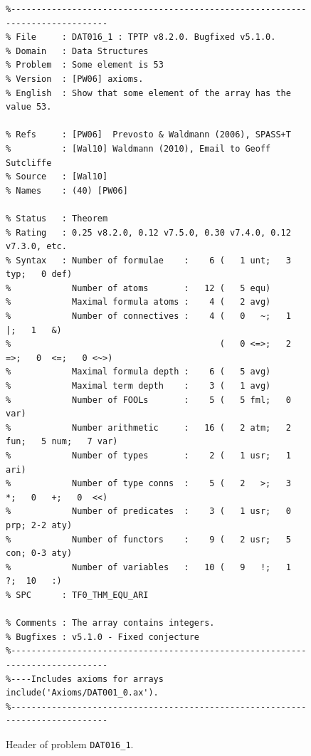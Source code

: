 \documentclass[runningheads]{llncs}
\begin{document}
\begin{figure}[htb]
\centering
{\scriptsize
{\setlength{\baselineskip}{2.5mm}
\begin{verbatim}
%------------------------------------------------------------------------------
% File     : DAT016_1 : TPTP v8.2.0. Bugfixed v5.1.0.
% Domain   : Data Structures
% Problem  : Some element is 53
% Version  : [PW06] axioms.
% English  : Show that some element of the array has the value 53.

% Refs     : [PW06]  Prevosto & Waldmann (2006), SPASS+T
%          : [Wal10] Waldmann (2010), Email to Geoff Sutcliffe
% Source   : [Wal10]
% Names    : (40) [PW06]

% Status   : Theorem
% Rating   : 0.25 v8.2.0, 0.12 v7.5.0, 0.30 v7.4.0, 0.12 v7.3.0, etc.
% Syntax   : Number of formulae    :    6 (   1 unt;   3 typ;   0 def)
%            Number of atoms       :   12 (   5 equ)
%            Maximal formula atoms :    4 (   2 avg)
%            Number of connectives :    4 (   0   ~;   1   |;   1   &)
%                                         (   0 <=>;   2  =>;   0  <=;   0 <~>)
%            Maximal formula depth :    6 (   5 avg)
%            Maximal term depth    :    3 (   1 avg)
%            Number of FOOLs       :    5 (   5 fml;   0 var)
%            Number arithmetic     :   16 (   2 atm;   2 fun;   5 num;   7 var)
%            Number of types       :    2 (   1 usr;   1 ari)
%            Number of type conns  :    5 (   2   >;   3   *;   0   +;   0  <<)
%            Number of predicates  :    3 (   1 usr;   0 prp; 2-2 aty)
%            Number of functors    :    9 (   2 usr;   5 con; 0-3 aty)
%            Number of variables   :   10 (   9   !;   1   ?;  10   :)
% SPC      : TF0_THM_EQU_ARI

% Comments : The array contains integers.
% Bugfixes : v5.1.0 - Fixed conjecture
%------------------------------------------------------------------------------
%----Includes axioms for arrays
include('Axioms/DAT001_0.ax').
%------------------------------------------------------------------------------
\end{verbatim}
}}
\caption{Header of problem {\tt DAT016\_1}.}
\label{ExampleHeader}
\end{figure}
\end{document}
